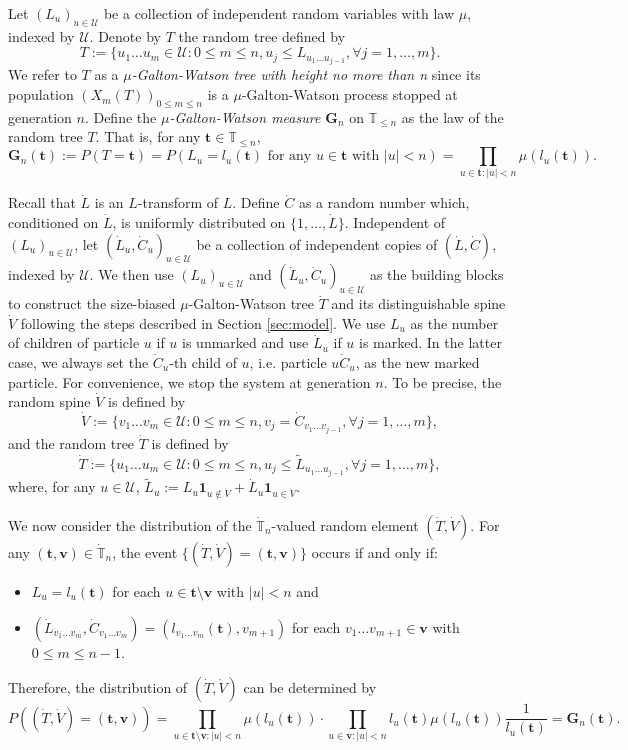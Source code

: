 \documentclass[ECP]{ejpecp} %
\begin{document}
Let $(L_u)_{u\in\mathcal U}$ be a collection of independent random variables with law $\mu$, indexed by $\mathcal U$.
Denote by $T$ the random tree defined by
\[
T
:=\{u_1\dots u_m\in \mathcal U: 0\le m\le n, u_j\leq L_{u_1\dots u_{j-1}},\forall j=1,\dots,m\}.
\]
We refer to $T$ as a \emph{$\mu$-Galton-Watson tree with height no more than n} since its population $(X_m(T))_{0\le m\le n}$ is a $\mu$-Galton-Watson process stopped at generation $n$.
Define the \emph{$\mu$-Galton-Watson measure $\mathbf G_n$} on $\mathbb T_{\leq n}$ as the law of the random tree $T$.
That is, for any $ \mathbf t \in\mathbb T_{\leq n}$,
\[
\mathbf G_n( \mathbf t )
:=P(T= \mathbf t )
=P(L_u=l_u( \mathbf t )\text{ for any } u\in \mathbf t  \text{ with }|u|<n)
=\prod_{u\in  \mathbf t :|u|<n}\mu(l_u( \mathbf t )).
\]

Recall that $\dot L$ is an $L$-transform of $L$.
Define $\dot C$ as a random number which, conditioned on $\dot L$, is uniformly distributed on $\{1,\dots,\dot L\}$.
Independent of $(L_u)_{u\in\mathcal U}$, let $(\dot L_u,\dot C_u)_{u\in \mathcal U}$ be a collection of independent copies of $(\dot L,\dot C)$, indexed by $\mathcal U$.
We then use $(L_u)_{u\in\mathcal U}$ and $(\dot L_u,\dot C_u)_{u\in\mathcal U}$ as the building blocks to construct the size-biased $\mu$-Galton-Watson tree $\dot T$ and its distinguishable spine $\dot V$ following the steps described in Section \ref{sec:model}.
We use $L_u$ as the number of children of particle $u$ if $u$ is unmarked and use $\dot L_u$ if $u$ is marked.
In the latter case, we always set the
$\dot C_u$-th child of $u$, i.e. particle $u \dot C_u$,
as the new marked particle.
For convenience, we stop the system at generation $n$. To be precise, the random spine $\dot V$ is defined by
\[
\dot V
:=\{v_1\dots v_m\in \mathcal U:0\le m\le n, v_j=\dot C_{v_1\dots v_{j-1}},\forall j=1,\dots,m\},
\]
and the random tree $\dot T$ is defined by
\[
\dot T
:=\{u_1\dots u_m\in\mathcal U: 0\le m\le n,u_j\leq \tilde L_{u_1\dots u_{j-1}},\forall j=1,\dots,m\},
\]
where, for any $u\in\mathcal U$, $\tilde L_u:=L_u\mathbf 1_{u\not\in \dot V}+\dot L_u\mathbf 1_{u\in \dot V}$.

We now consider the distribution of the $\dot{\mathbb T}_n$-valued random element $(\dot T,\dot V)$.
For any $( \mathbf t , \mathbf v)\in\dot{\mathbb T}_n$, the event $\{(\dot T,\dot V)=( \mathbf t , \mathbf v)\}$ occurs if and only if:
\begin{itemize}
	\item
	$L_u=l_u( \mathbf t )$ for each $u\in  \mathbf t \setminus \mathbf v$ with $| u |<n$ and
	\item
	$(\dot L_{v_1\dots v_m},\dot C_{v_1\dots v_m})=(l_{v_1\dots v_m}( \mathbf t ),v_{m+1})$ for each $v_1\dots v_{m+1}\in \mathbf v$ with $0\le m\le n-1$.
\end{itemize}
Therefore, the distribution of $(\dot T,\dot V)$ can be determined by
\begin{equation}
\label{eq:treespinemeasure}
P((\dot T,\dot V)=( \mathbf t , \mathbf v))
=\prod_{u\in  \mathbf t \setminus \mathbf v:|u|<n}\mu(l_u( \mathbf t ))
\cdot \prod_{u\in  \mathbf v:| u| <n}l_u( \mathbf t )\mu(l_u( \mathbf t ))\frac{1}{l_u( \mathbf t )}
= \mathbf G_n( \mathbf t ).
\end{equation}
\end{document}
